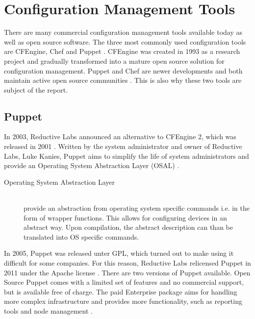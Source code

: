 \section{Configuration Management Tools}



There are many commercial configuration management tools available today as well as open source software. The three most commonly used configuration tools are CFEngine, Chef and Puppet \cite{pandey2012investigating}. CFEngine was created in 1993 as a research project and gradually transformed into a mature open source solution for configuration management\cite{Zamboni:2012:LCA:2341102}. Puppet and Chef are newer developments and both maintain active open source communities \cite{pandey2012investigating}. This is also why these two tools are subject of the report.


\subsection{Puppet}

In 2003, Reductive Labs announced an alternative to CFEngine 2, which was released in 2001 \cite{pandey2012investigating}. Written by the system administrator and owner of Reductive Labs, Luke Kanies, Puppet aims to simplify the life of system administrators and provide an Operating System Abstraction Layer (OSAL) \cite{kanies2006puppet}.
\begin{description}
	\item [Operating System Abstraction Layer] \hfill \\
	provide an abstraction from operating system specific commands i.e. in the form of wrapper functions. This allows for configuring devices in an abstract way. Upon compilation, the abstract description can than be translated into OS specific commands.
\end{description}
In 2005, Puppet was released unter GPL, which turned out to make using it difficult for some companies. For this reason, Reductive Labs relicensed Puppet in 2011 under the Apache license \cite{puppetcomapache}. There are two versions of Puppet available. Open Source Puppet comes with a limited set of features and no commercial support, but is available free of charge. The paid Enterprise package aims for handling more complex infrastructure and provides more functionality, such as reporting tools and node management \cite{puppetcomenterprise}.


